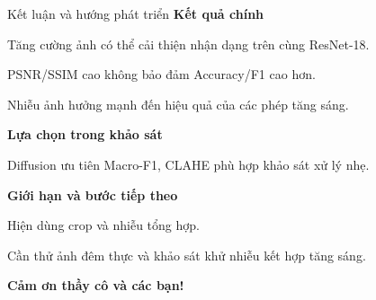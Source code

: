 \documentclass[aspectratio=169,10pt]{beamer}
\begin{document}
\begin{frame}{Kết luận và hướng phát triển}\relax
\textbf{Kết quả chính}\par
Tăng cường ảnh có thể cải thiện nhận dạng trên cùng ResNet-18.\par
PSNR/SSIM cao không bảo đảm Accuracy/F1 cao hơn.\par
Nhiễu ảnh hưởng mạnh đến hiệu quả của các phép tăng sáng.
\par\vspace{3mm}
\textbf{Lựa chọn trong khảo sát}\par
Diffusion ưu tiên Macro-F1, CLAHE phù hợp khảo sát xử lý nhẹ.
\par\vspace{3mm}
\textbf{Giới hạn và bước tiếp theo}\par
Hiện dùng crop và nhiễu tổng hợp.\par
Cần thử ảnh đêm thực và khảo sát khử nhiễu kết hợp tăng sáng.
\par\vspace{3mm}
{\color{Teal}\large\bfseries Cảm ơn thầy cô và các bạn!}
\end{frame}
\end{document}
